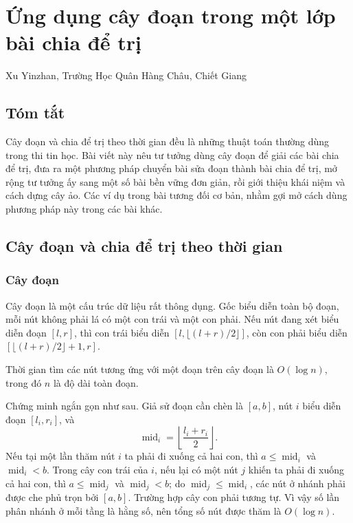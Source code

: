 \documentclass[11pt]{article}
\begin{document}
\section{Ứng dụng cây đoạn trong một lớp bài chia để trị}

\begin{center}
Xu Yinzhan, Trường Học Quân Hàng Châu, Chiết Giang
\end{center}

\subsection*{Tóm tắt}

Cây đoạn và chia để trị theo thời gian đều là những thuật toán thường dùng
trong thi tin học. Bài viết này nêu tư tưởng dùng cây đoạn để giải các bài
chia để trị, đưa ra một phương pháp chuyển bài sửa đoạn thành bài chia để trị,
mở rộng tư tưởng ấy sang một số bài bền vững đơn giản, rồi giới thiệu khái
niệm và cách dựng cây ảo. Các ví dụ trong bài tương đối cơ bản, nhằm gợi mở
cách dùng phương pháp này trong các bài khác.

\subsection{Cây đoạn và chia để trị theo thời gian}

\subsubsection{Cây đoạn}

Cây đoạn là một cấu trúc dữ liệu rất thông dụng. Gốc biểu diễn toàn bộ đoạn,
mỗi nút không phải lá có một con trái và một con phải. Nếu nút đang xét biểu
diễn đoạn \([l,r]\), thì con trái biểu diễn
\([l,\lfloor(l+r)/2\rfloor]\), còn con phải biểu diễn
\([\lfloor(l+r)/2\rfloor+1,r]\).

Thời gian tìm các nút tương ứng với một đoạn trên cây đoạn là
\(O(\log n)\), trong đó \(n\) là độ dài toàn đoạn.

Chứng minh ngắn gọn như sau. Giả sử đoạn cần chèn là \([a,b]\), nút \(i\)
biểu diễn đoạn \([l_i,r_i]\), và
\[
  \operatorname{mid}_i=\left\lfloor\frac{l_i+r_i}{2}\right\rfloor.
\]
Nếu tại một lần thăm nút \(i\) ta phải đi xuống cả hai con, thì
\(a\le \operatorname{mid}_i\) và \(\operatorname{mid}_i<b\). Trong cây con trái
của \(i\), nếu lại có một nút \(j\) khiến ta phải đi xuống cả hai con, thì
\(a\le \operatorname{mid}_j\) và \(\operatorname{mid}_j<b\); do
\(\operatorname{mid}_j\le \operatorname{mid}_i\), các nút ở nhánh phải được
che phủ trọn bởi \([a,b]\). Trường hợp cây con phải tương tự. Vì vậy số lần
phân nhánh ở mỗi tầng là hằng số, nên tổng số nút được thăm là \(O(\log n)\).
\end{document}
